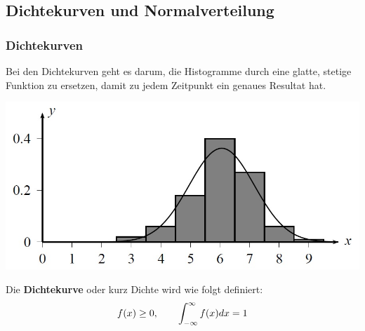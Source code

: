 \documentclass[12pt,a4paper]{article} %
\newcommand{\tab}{\hspace*{2em}} %
\begin{document}


\begin{center}
\end{center}

\subsection{Dichtekurven und Normalverteilung}

\subsubsection{Dichtekurven}
Bei den Dichtekurven geht es darum, die Histogramme durch eine glatte, stetige Funktion zu ersetzen, damit zu jedem Zeitpunkt ein genaues Resultat hat.

\begin{center}
\includegraphics[scale=0.5]{histoZuStetig.jpg}
\end{center}

Die \textbf{Dichtekurve} oder kurz Dichte wird wie folgt definiert:
$$f(x)\ge 0,\tab \int_{-\infty}^\infty f(x)dx = 1$$
\end{document}
